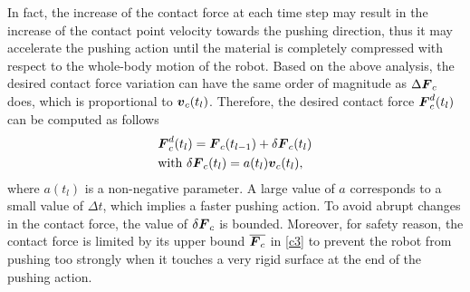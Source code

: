 \documentclass[letterpaper, 10 pt, conference]{ieeeconf}  %
\newcommand{\vect}[1]{\mbox{\boldmath${#1}$}}%
\begin{document}
In fact, the increase of the contact force at each time step may result in the increase of the contact point velocity towards the pushing direction, thus it may accelerate the pushing action until the material is completely compressed with respect to the whole-body motion of the robot.
Based on the above analysis, the desired contact force variation can have the same order of magnitude as $\Delta \vect{F}_c$ does, which is proportional to $\vect{v}_c(t_l)$.
Therefore, the desired contact force $\vect{F}_c^d(t_l)$ can be computed as follows 
\begin{equation}
\begin{aligned}
&\vect{F}_c^d(t_l) = \vect{F}_c(t_{l-1}) + \delta\vect{F}_c(t_l) \label{fc}\\
&\text{with}\ \delta\vect{F}_c(t_l) = a(t_l) \vect{v}_c(t_l),
\end{aligned}
\end{equation}
 where $a(t_l)$ is a non-negative parameter. A large value of $a$ corresponds to a small value of $\Delta t$, which implies a faster pushing action. To avoid abrupt changes in the contact force, the value of $\delta\vect{F}_c$ is bounded. Moreover, for safety reason, the contact force is limited by its upper bound $\overline{\vect{F}_c}$ in \eqref{c3} to prevent the robot from pushing too strongly when it touches a very rigid surface at the end of the pushing action.
 
\end{document}
